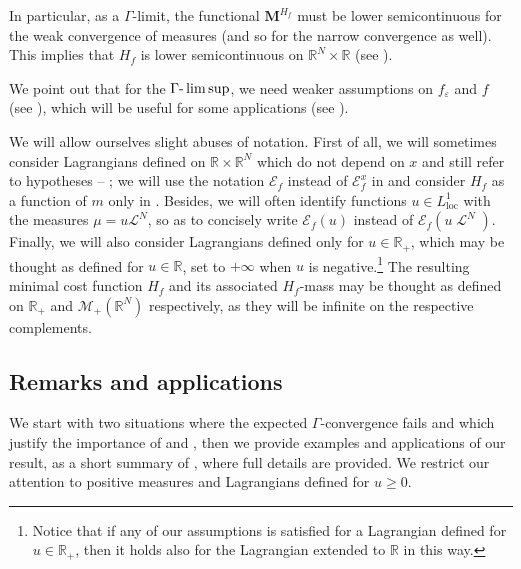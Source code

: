 \documentclass[10pt]{amsart}
\theoremstyle{plain}
\theoremstyle{definition}
\newcommand{\R}{\mathbb{R}}
\newcommand{\Mspace}{\mathscr{M}}
\newcommand{\ener}{\mathcal{E}}
\newcommand{\mass}{\boldsymbol{M}}
\newcommand{\loc}{\mathrm{loc}}
\newcommand{\eps}{\varepsilon}
\DeclareMathOperator{\lbm}{\mathcal{L}}
\begin{document}
In particular, as a \(\Gamma\)-limit, the functional \(\mass^{H_f}\) must be lower semicontinuous for the weak convergence of measures (and so for the narrow convergence as well). This implies that \(H_f\) is lower semicontinuous on \(\R^N\times\R\) (see ).

We point out that for the \(\Gamma\textup{-}\limsup\), we need weaker assumptions on \(f_\eps\) and \(f\) (see ), which will be useful for some applications (see ).

We will allow ourselves slight abuses of notation. First of all, we will sometimes consider Lagrangians defined on $\R \times \R^N$ which do not depend on $x$ and still refer to hypotheses -- ; we will use the notation $\ener_f$ instead of $\ener_f^x$ in  and consider $H_f$ as a function of $m$ only in . Besides, we will often identify functions $u\in L^1_{\loc}$ with the measures $\mu = u\mathcal L^N$, so as to concisely write $\ener_f(u)$ instead of $\ener_f(u\lbm^N)$. Finally, we will also consider Lagrangians defined only for $u\in \R_+$, which may be thought as defined for $u\in \R$, set to $+\infty$ when $u$ is negative.\footnote{Notice that if any of our assumptions is satisfied for a Lagrangian defined for $u \in \R_+$, then it holds also for the Lagrangian extended to $\R$ in this way.} The resulting minimal cost function $H_f$ and its associated $H_f$-mass may be thought as defined on $\R_+$ and $\Mspace_+(\R^N)$ respectively, as they will be infinite on the respective complements.

\subsection{Remarks and applications}\label{sectionExamplesIntroduction}

We start with two situations where the expected $\Gamma$-convergence fails and which justify the importance of  and , then we provide examples and applications of our result, as a short summary of , where full details are provided. We restrict our attention to positive measures and Lagrangians defined for $u\geq 0$.
\end{document}
